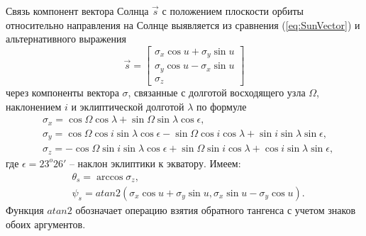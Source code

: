 Связь компонент вектора Солнца $\vec{s}$ с положением плоскости орбиты относительно
направления на Солнце выявляется из сравнения (\ref{eq:SunVector}) и альтернативного
выражения
\begin{equation}
  \vec{s} = \begin{bmatrix}
    \sigma_x\cos u + \sigma_y\sin u \\
    \sigma_y\cos u - \sigma_x\sin u \\
    \sigma_z
  \end{bmatrix}
\end{equation}
через компоненты вектора $\sigma$, связанные с долготой восходящего узла $\Omega$,
наклонением $i$ и эклиптической долготой $\lambda$ по формуле
\begin{equation}
\begin{aligned}
    & \sigma_x =  \cos\Omega\cos\lambda + \sin\Omega\sin\lambda\cos\epsilon, \\
    & \sigma_y =  \cos\Omega\cos i\sin\lambda\cos\epsilon - \sin\Omega\cos i\cos\lambda + \sin i\sin\lambda\sin\epsilon, \\
    & \sigma_z = -\cos\Omega\sin i\sin\lambda\cos\epsilon + \sin\Omega\sin i\cos\lambda + \cos i\sin\lambda\sin\epsilon,
\end{aligned}
\end{equation}
где $\epsilon = 23^o26'$ -- наклон эклиптики к экватору. Имеем:
\begin{equation}
  \begin{aligned}
    & \theta_s = \arccos\sigma_z, \\
    & \psi_s = atan2(\sigma_x\cos u + \sigma_y\sin u, \sigma_x\sin u - \sigma_y\cos u).
  \end{aligned}
\end{equation}
Функция $atan2$ обозначает операцию взятия обратного тангенса с учетом знаков
обоих аргументов.
